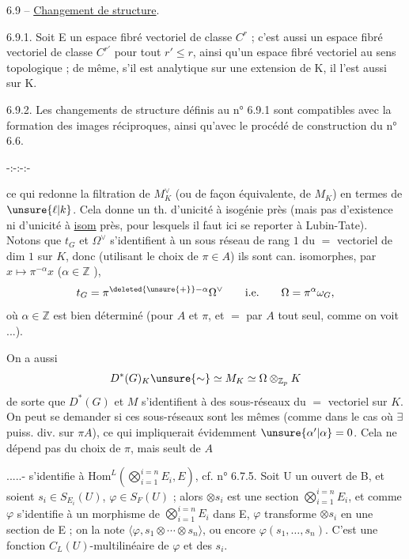 6.9 -- \uline{Changement de structure}.

6.9.1. Soit E un espace fibré vectoriel de classe $C^r$ ; c'est aussi un espace fibré vectoriel de classe $C^{r'}$ pour tout $r'\leq r$, ainsi qu'un espace fibré vectoriel au sens topologique ; de même, s'il est analytique sur une extension de K, il l'est aussi sur K.

6.9.2. Les changements de structure définis au n° 6.9.1 sont compatibles avec la formation des images réciproques, ainsi qu'avec le \qquad procédé de construction du n° 6.6.
\begin{center}-:-:-:-\end{center}
ce qui redonne la filtration de $M_K^{\vee}$ (ou de façon équivalente, de $M_K$) en termes de $\unsure{\ell|k}$.
Cela donne un th. d'unicité à isogénie près (mais pas d'existence ni d'unicité à \uline{isom} près, pour lesquels il faut ici se reporter à Lubin-Tate). Notons que $t_G$ et $\Omega^{\vee}$ s'identifient à un sous réseau de rang $1$ du $=$ vectoriel de dim $1$ sur $K$, donc (utilisant le choix de $\pi\in A$) ils sont can. isomorphes,  par  $x\longmapsto\pi^{-\alpha}x$ ($\alpha\in\mathbb Z$ ),
\[
t_G=\pi^{\deleted{\unsure{+}}-\alpha}\Omega^{\vee}\qquad\text{i.e.}\qquad\Omega=\pi^\alpha\omega_G,
\]
 où $\alpha\in\mathbb Z$ est bien déterminé (pour $A$ et $\pi$, et $=$ par $A$ tout seul, comme on voit ...).

On a aussi
\[
D^*(G)_K\unsure{\sim}\simeq M_K\simeq\Omega\otimes_{\mathbb Z_p}K
\]
de sorte que $D^*(G)$ et $M$ s'identifient à des sous-réseaux du $=$ vectoriel sur $K$. On peut se demander si ces sous-réseaux sont les mêmes (comme dans le cas où $\exists$ puiss. div. sur $\pi A$), ce qui impliquerait évidemment $\unsure{\alpha'|\alpha}=0$.
Cela ne dépend pas du choix de $\pi$, mais seult de $A$

.....-
s'identifie à $\mathrm{Hom}^L(\bigotimes_{i=1}^{i=n}E_i,E)$, cf. n° 6.7.5. Soit U un ouvert de B, et soient $s_i\in S_{E_i}(U)$, $\varphi\in S_F(U)$ ; alors $\otimes s_i$ est une section $\bigotimes_{i=1}^{i=n}E_i$, et comme $\varphi$ s'identifie à un morphisme de $\bigotimes_{i=1}^{i=n}E_i$ dans E, $\varphi$ transforme $\otimes s_i$ en une section de E ; on la note $\langle\varphi,s_1\otimes\cdots\otimes s_n\rangle$, ou encore $\varphi(s_1,\ldots,s_n)$. C'est une fonction $C_L(U)$-multilinéaire de $\varphi$ et des $s_i$.

